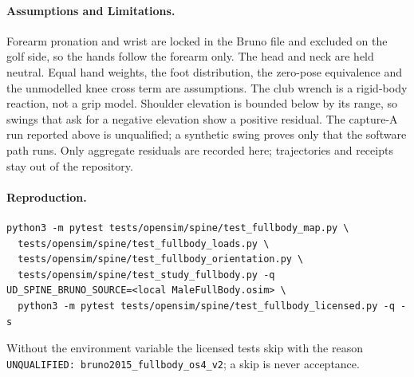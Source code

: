 \paragraph{Assumptions and Limitations.}
Forearm pronation and wrist are locked in the Bruno file and excluded on the golf
side, so the hands follow the forearm only. The head and neck are held neutral.
Equal hand weights, the foot distribution, the zero-pose equivalence and the
unmodelled knee cross term are assumptions. The club wrench is a rigid-body
reaction, not a grip model. Shoulder elevation is bounded below by its range, so
swings that ask for a negative elevation show a positive residual. The capture-A
run reported above is unqualified; a synthetic swing proves only that the
software path runs. Only aggregate residuals are recorded here; trajectories and receipts stay out of the repository.

\paragraph{Reproduction.}
\begin{verbatim}
python3 -m pytest tests/opensim/spine/test_fullbody_map.py \
  tests/opensim/spine/test_fullbody_loads.py \
  tests/opensim/spine/test_fullbody_orientation.py \
  tests/opensim/spine/test_study_fullbody.py -q
UD_SPINE_BRUNO_SOURCE=<local MaleFullBody.osim> \
  python3 -m pytest tests/opensim/spine/test_fullbody_licensed.py -q -s
\end{verbatim}
Without the environment variable the licensed tests skip with the reason
\texttt{UNQUALIFIED: bruno2015\_fullbody\_os4\_v2}; a skip is never acceptance.
